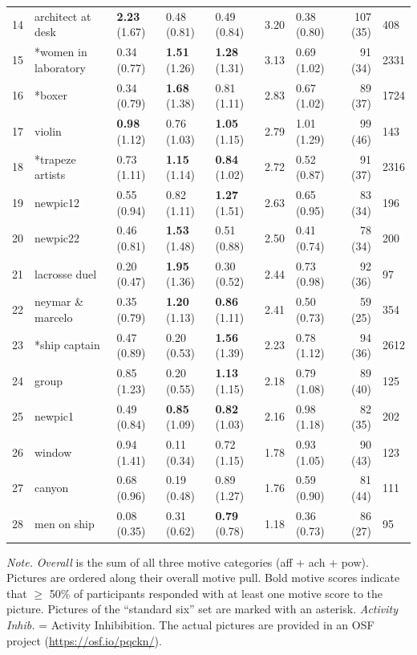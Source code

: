 \documentclass[man,a4paper,mask]{apa6}\usepackage[]{graphicx}\usepackage[]{color}
\begin{document}
\begin{table}
\begin{threeparttable}
\begin{tabularx}{\textwidth}{rllllllr}
   14 & architect at desk & \textbf{2.23} (1.67) & 0.48 (0.81) & 0.49 (0.84) & 3.20 & 0.38 (0.80) & 107 (35) & 408 \\ 
   15 & *women in laboratory & 0.34 (0.77) & \textbf{1.51} (1.26) & \textbf{1.28} (1.31) & 3.13 & 0.69 (1.02) & 91 (34) & 2331 \\ 
   16 & *boxer & 0.34 (0.79) & \textbf{1.68} (1.38) & 0.81 (1.11) & 2.83 & 0.67 (1.02) & 89 (37) & 1724 \\ 
   17 & violin & \textbf{0.98} (1.12) & 0.76 (1.03) & \textbf{1.05} (1.15) & 2.79 & 1.01 (1.29) & 99 (46) & 143 \\ 
   18 & *trapeze artists & 0.73 (1.11) & \textbf{1.15} (1.14) & \textbf{0.84} (1.02) & 2.72 & 0.52 (0.87) & 91 (37) & 2316 \\ 
   19 & newpic12 & 0.55 (0.94) & 0.82 (1.11) & \textbf{1.27} (1.51) & 2.63 & 0.65 (0.95) & 83 (34) & 196 \\ 
   20 & newpic22 & 0.46 (0.81) & \textbf{1.53} (1.48) & 0.51 (0.88) & 2.50 & 0.41 (0.74) & 78 (34) & 200 \\ 
   21 & lacrosse duel & 0.20 (0.47) & \textbf{1.95} (1.36) & 0.30 (0.52) & 2.44 & 0.73 (0.98) & 92 (36) &  97 \\ 
   22 & neymar \& marcelo & 0.35 (0.79) & \textbf{1.20} (1.13) & \textbf{0.86} (1.11) & 2.41 & 0.50 (0.73) & 59 (25) & 354 \\ 
   23 & *ship captain & 0.47 (0.89) & 0.20 (0.53) & \textbf{1.56} (1.39) & 2.23 & 0.78 (1.12) & 94 (36) & 2612 \\ 
   24 & group & 0.85 (1.23) & 0.20 (0.55) & \textbf{1.13} (1.15) & 2.18 & 0.79 (1.08) & 89 (40) & 125 \\ 
   25 & newpic1 & 0.49 (0.84) & \textbf{0.85} (1.09) & \textbf{0.82} (1.03) & 2.16 & 0.98 (1.18) & 82 (35) & 202 \\ 
   26 & window & 0.94 (1.41) & 0.11 (0.34) & 0.72 (1.15) & 1.78 & 0.93 (1.05) & 90 (43) & 123 \\ 
   27 & canyon & 0.68 (0.96) & 0.19 (0.48) & 0.89 (1.27) & 1.76 & 0.59 (0.90) & 81 (44) & 111 \\ 
   28 & men on ship & 0.08 (0.35) & 0.31 (0.62) & \textbf{0.79} (0.78) & 1.18 & 0.36 (0.73) & 86 (27) &  95 \\ 
   \hline

		
		\bottomrule
		\end{tabularx}
		\begin{tablenotes}[para,flushleft]
			{\small
			\vspace*{0.75em}
			\textit{Note.} \emph{Overall} is the sum of all three motive categories (aff + ach + pow). Pictures are ordered along their overall motive pull. Bold motive scores indicate that $\geq$ 50\% of participants responded with at least one motive score to the picture. Pictures of the ``standard six'' set are marked with an asterisk. \emph{Activity Inhib.} = Activity Inhibibition. The actual pictures are provided in an OSF project (\url{https://osf.io/pqckn/}).}
	      \end{tablenotes}
	  \end{threeparttable}
\end{table}
\end{document}
